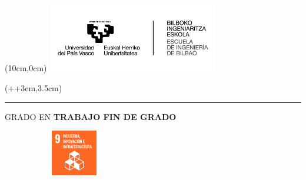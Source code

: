 
\begin{titlepage}
    \begin{textblock*}{\textwidth}(10cm,0cm)
        \includegraphics[width=7.5cm, height=3cm]{images/logos/Logo_EHU.jpg}
    \end{textblock*}
    
    
    \begin{textblock*}{\paperwidth}(\dimexpr\parindent+\oddsidemargin+3em\relax,3.5cm)
        \begin{minipage}{\dimexpr\linewidth-7.5cm\relax}
            \color{white}
            \noindent\rule{\linewidth}{0cm}
            \textsf{ {\large GRADO EN \grado}}
            \newline
            \newline \newline
            \textsf{\textbf{ {\Huge TRABAJO FIN DE GRADO }}}
        \end{minipage}
    \end{textblock*}
    
    \vspace*{3.5cm}
    \begin{minipage}{\linewidth}
        \setlength{\baselineskip}{1.7\baselineskip}
        \centering
        \textsf{ \textbf{ {\LARGE \titulo}}}
    \end{minipage}

    \vspace*{0.5cm}
    \begin{figure}[H]
        \centering
        
    \end{figure}

    \vspace*{1cm}
    \begin{figure}[h]
    \centering
        \begin{subfigure}[b]{0.135\textwidth}
            \includegraphics[width=2cm, height=2cm]{images/iconos_ods/09.png}
        \end{subfigure}
        

\end{figure}
\end{titlepage}

